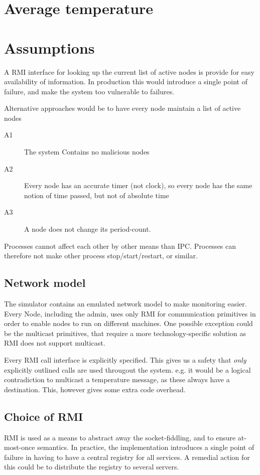 \documentclass[10pt,a4paper]{article}
\begin{document}
\section{Average temperature}

\section{Assumptions}
A RMI interface for looking up the current list of active nodes is provide for easy availability of information. In production this would introduce a single point of failure, and make the system too vulnerable to failures.


Alternative approaches would be to have every node maintain a list of active nodes

\begin{description}
 \item[A1] The system Contains no malicious nodes
 \item[A2] Every node has an accurate timer (not clock), so every node has the same notion of time passed, but not of absolute time
 \item[A3] A node does not change its period-count.
\end{description} 



Processes cannot affect each other by other means than IPC. Processes can therefore not make other process stop/start/restart, or similar.

\subsection{Network model}
The simulator contains an emulated network model to make monitoring easier. Every Node, including the admin, uses only RMI for communication primitives in order to enable nodes to run on different machines.
One possible exception could be the multicast primitives, that require a more technology-specific solution as RMI does not support multicast.

Every RMI call interface is explicitly specified. This gives us a safety that \emph{only} explicitly outlined calls are used througout the system. e.g. it would be a logical contradiction to multicast a temperature message, as these always have a destination. This, however gives some extra code overhead.

\subsection{Choice of RMI}
RMI is used as a means to abstract away the socket-fiddling, and to ensure at-most-once semantics. In practice, the implementation introduces a single point of failure in having to have a central registry for all services. A remedial action for this could be to distribute the registry to several servers.
\end{document}
